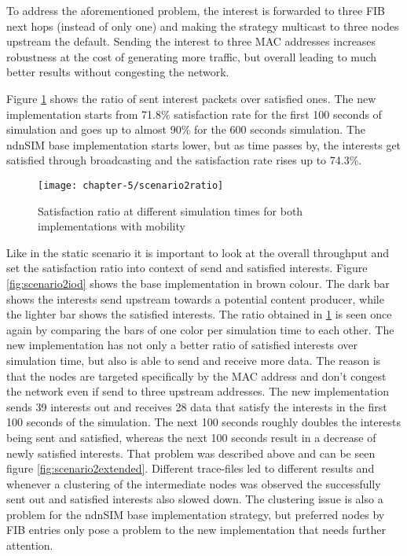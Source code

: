 To address the aforementioned problem, the interest is forwarded to three FIB next hops (instead of only one) and making the strategy multicast to three nodes upstream the default. Sending the interest to three MAC addresses increases robustness at the cost of generating more traffic, but overall leading to much better results without congesting the network.

Figure \ref{fig:scenario2ratio} shows the ratio of sent interest packets over satisfied ones. The new implementation starts from 71.8\% satisfaction rate for the first 100 seconds of simulation and goes up to almost 90\% for the 600 seconds simulation. The ndnSIM base implementation starts lower, but as time passes by, the interests get satisfied through broadcasting and the satisfaction rate rises up to 74.3\%.

\begin{figure}[H]
  \centering
  \texttt{[image: chapter-5/scenario2ratio]}
  \caption{Satisfaction ratio at different simulation times for both implementations with mobility}
  \label{fig:scenario2ratio}
\end{figure}

Like in the static scenario it is important to look at the overall throughput and set the satisfaction ratio into context of send and satisfied interests. Figure \ref{fig:scenario2iod} shows the base implementation in brown colour. The dark bar shows the interests send upstream towards a potential content producer, while the lighter bar shows the satisfied interests. The ratio obtained in \ref{fig:scenario2ratio} is seen once again by comparing the bars of one color per simulation time to each other. The new implementation has not only a better ratio of satisfied interests over simulation time, but also is able to send and receive more data. The reason is that the nodes are targeted specifically by the MAC address and don't congest the network even if send to three upstream addresses.
The new implementation sends 39 interests out and receives 28 data that satisfy the interests in the first 100 seconds of the simulation. The next 100 seconds roughly doubles the interests being sent and satisfied, whereas the next 100 seconds result in a decrease of newly satisfied interests. That problem was described above and can be seen figure \ref{fig:scenario2extended}. Different trace-files led to different results and whenever a clustering of the intermediate nodes was observed the successfully sent out and satisfied interests also slowed down. The clustering issue is also a problem for the ndnSIM base implementation strategy, but preferred nodes by FIB entries only pose a problem to the new implementation that needs further attention.

